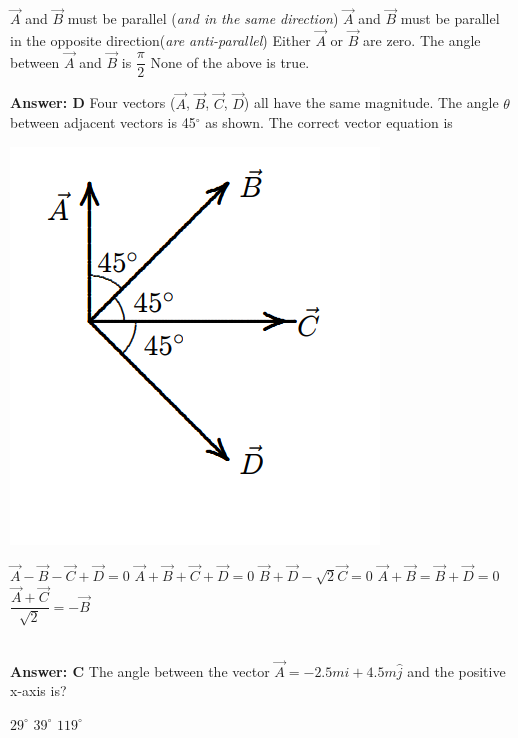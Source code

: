 \documentclass[12pt,addpoints]{exam}
\begin{document}
{{{\begin{questions}
					\begin{choices}
						\choice $\vec{A}$ and $\vec{B}$ must be parallel (\textit{and in the same direction})
						\choice $\vec{A}$ and $\vec{B}$ must be parallel in the opposite direction(\textit{are anti-parallel})
						\choice Either $\vec{A}$ or $\vec{B}$ are zero.
						\choice The angle between $\vec{A}$ and $\vec{B}$ is $\dfrac{\pi}{2}$
						\choice None of the above is true.
					\end{choices}
					\textbf{Answer: D}
					\question Four vectors ($\vec{A}$, $\vec{B}$, $\vec{C}$, $\vec{D}$) all have the same magnitude. The angle $\theta$ between adjacent vectors
					is 45$^\circ$ as shown. The correct vector equation is
					\begin{center}
						\includegraphics[scale=0.4]{vecs2.png}
					\end{center} 
					\begin{oneparchoices}
						\choice $\vec{A}-\vec{B}-\vec{C}+\vec{D}=0$
						\choice $\vec{A}+\vec{B}+\vec{C}+\vec{D}=0$ 
						\choice $\vec{B}+\vec{D}-\sqrt{2}\vec C=0$
						\choice $\vec{A}+\vec{B}=\vec{B}+\vec{D}=0$
						\choice $\dfrac{\vec{A}+\vec{C}}{\sqrt{2}}=-\vec{B}$	
					\end{oneparchoices}
					\\
					\textbf{Answer: C}
					\question The angle between the vector $\vec{A}=-2.5m\hat i+4.5m\hat j$ and the positive x-axis is? \\ 
					\begin{oneparchoices}
						\choice $29^\circ$
						\choice $39^\circ$
						\choice $119^\circ$

\end{oneparchoices}
\end{questions}}}}
\end{document}
